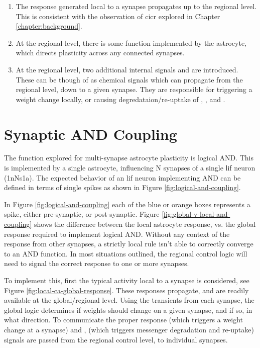 \begin{enumerate}
\item The \ca response generated local to a synapse propagates up to the
  regional level. This is consistent with the observation of \gls{cicr} explored in
  Chapter \ref{chapter:background}.
\item At the regional level, there is some function implemented by the
  astrocyte, which directs plasticity across any connected synapses.
\item At the regional level, two additional internal signals \dser and
  \serca are introduced. These can be though of as chemical signals which can
  propagate from the regional level, down to a given synapse. They are
  responsible for triggering a weight change locally, or causing
  degredataion/re-uptake of \ipt, \kp, and \ca.
\end{enumerate}


\section{Synaptic AND Coupling}
The function explored for multi-synapse astrocyte plasticity is logical
AND. This is implemented by a single astrocyte, influencing N synapses of a
single \gls{lif} neuron (1nNs1a). The expected behavior of an \gls{lif} neuron
implementing AND can be defined in terms of single spikes as shown in Figure
\ref{fig:logical-and-coupling}.


In Figure \ref{fig:logical-and-coupling} each of the blue or orange boxes
represents a spike, either pre-synaptic, or post-synaptic. Figure
\ref{fig:global-v-local-and-coupling} shows the difference between the local
astrocyte response, vs. the global response required to implement logical
AND. Without any context of the response from other synapses, a strictly local
rule isn't able to correctly converge to an AND function. In most situations
outlined, the regional control logic will need to signal the correct response to
one or more synapses.

To implement this, first the typical activity local to a synapse is considered,
see Figure \ref{fig:local-ca-global-response}. These \ca responses propagate,
and are readily available at the global/regional level. Using the \ca transients
from each synapse, the global logic determines if weights should change on a
given synapse, and if so, in what direction. To communicate the proper response
\dser (which triggers a weight change at a synapse) and \serca, (which triggers
messenger degradation and re-uptake) signals are passed from the regional
control level, to individual synapses.

